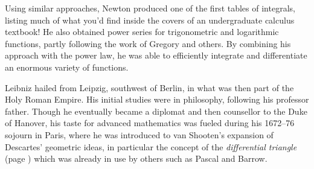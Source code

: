 Using similar approaches, Newton produced one of the first tables of integrals, listing much of what you'd find inside the covers of an undergraduate calculus textbook! He also obtained power series for trigonometric and logarithmic functions, partly following the work of Gregory and others. By combining his approach with the power law, he was able to efficiently integrate and differentiate an enormous variety of functions.\smallbreak



\goodbreak




Leibniz hailed from Leipzig, southwest of Berlin, in what was then part of the Holy Roman Empire. His initial studies were in philosophy, following his professor father. Though he eventually became a diplomat and then counsellor to the Duke of Hanover, his taste for advanced mathematics was fueled during his 1672--76 sojourn in Paris, where he was introduced to van Shooten's expansion of Descartes' geometric ideas, in particular the concept of the \emph{differential triangle} (page \pageref{sec:calc2}) which was already in use by others such as Pascal and Barrow.\smallbreak

